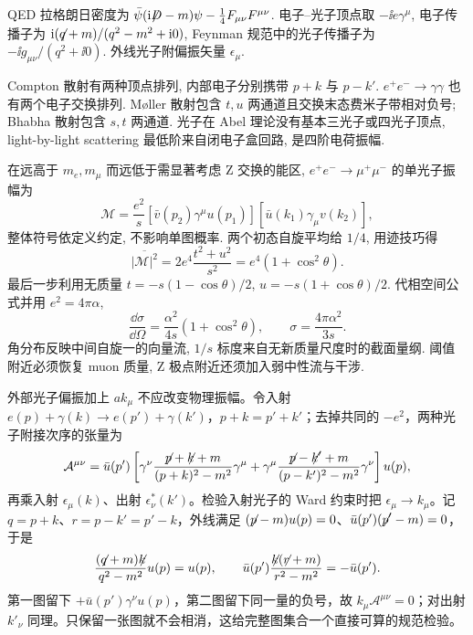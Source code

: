\label{ch:qed}
QED 拉格朗日密度为 $\bar\psi(\ii\slashed D-m)\psi-\tfrac14F_{\mu\nu}F^{\mu\nu}$. 电子--光子顶点取 $-\ii e\gamma^\mu$, 电子传播子为 $\ii(\slashed q+m)/(q^2-m^2+\ii0)$, Feynman 规范中的光子传播子为 $-\ii g_{\mu\nu}/(q^2+\ii0)$. 外线光子附偏振矢量 $\epsilon_\mu$.

Compton 散射有两种顶点排列, 内部电子分别携带 $p+k$ 与 $p-k'$. $e^+e^-\to\gamma\gamma$ 也有两个电子交换排列. Møller 散射包含 $t,u$ 两通道且交换末态费米子带相对负号; Bhabha 散射包含 $s,t$ 两通道. 光子在 Abel 理论没有基本三光子或四光子顶点, light-by-light scattering 最低阶来自闭电子盒回路, 是四阶电荷振幅.

在远高于 $m_e,m_\mu$ 而远低于需显著考虑 Z 交换的能区, $e^+e^-\to\mu^+\mu^-$ 的单光子振幅为
\begin{equation}
 \mathcal M=\frac{e^2}{s}[\bar v(p_2)\gamma^\mu u(p_1)]
 [\bar u(k_1)\gamma_\mu v(k_2)],
\end{equation}
整体符号依定义约定, 不影响单图概率. 两个初态自旋平均给 $1/4$, 用迹技巧得
\begin{equation}
 \overline{|\mathcal M|^2}=2e^4\frac{t^2+u^2}{s^2}
 =e^4(1+\cos^2\theta).
\end{equation}
最后一步利用无质量 $t=-s(1-\cos\theta)/2$, $u=-s(1+\cos\theta)/2$. 代相空间公式并用 $e^2=4\pi\alpha$,
\begin{equation}
 \frac{\dd\sigma}{\dd\Omega}=\frac{\alpha^2}{4s}(1+\cos^2\theta),\qquad
 \sigma=\frac{4\pi\alpha^2}{3s}.
\end{equation}
角分布反映中间自旋一的向量流, $1/s$ 标度来自无新质量尺度时的截面量纲. 阈值附近必须恢复 muon 质量, Z 极点附近还须加入弱中性流与干涉.

外部光子偏振加上 $a k_\mu$ 不应改变物理振幅。令入射 $e(p)+\gamma(k)\to e(p')+\gamma(k')$，$p+k=p'+k'$；去掉共同的 $-e^2$，两种光子附接次序的张量为
\begin{equation}
\mathcal A^{\mu\nu}=\bar u(p')\left[
\gamma^\nu\frac{\slashed p+\slashed k+m}{(p+k)^2-m^2}\gamma^\mu
+\gamma^\mu\frac{\slashed p-\slashed k'+m}{(p-k')^2-m^2}\gamma^\nu
\right]u(p),
\end{equation}
再乘入射 $\epsilon_\mu(k)$、出射 $\epsilon_\nu^*(k')$。检验入射光子的 Ward 约束时把 $\epsilon_\mu\to k_\mu$。记 $q=p+k$、$r=p-k'=p'-k$，外线满足 $(\slashed p-m)u(p)=0$、$\bar u(p')(\slashed p'-m)=0$，于是
\begin{equation}
\frac{(\slashed q+m)\slashed k}{q^2-m^2}u(p)=u(p),\qquad
\bar u(p')\frac{\slashed k(\slashed r+m)}{r^2-m^2}=-\bar u(p').
\end{equation}
第一图留下 $+\bar u(p')\gamma^\nu u(p)$，第二图留下同一量的负号，故 $k_\mu\mathcal A^{\mu\nu}=0$；对出射 $k'_\nu$ 同理。只保留一张图就不会相消，这给完整图集合一个直接可算的规范检验。

